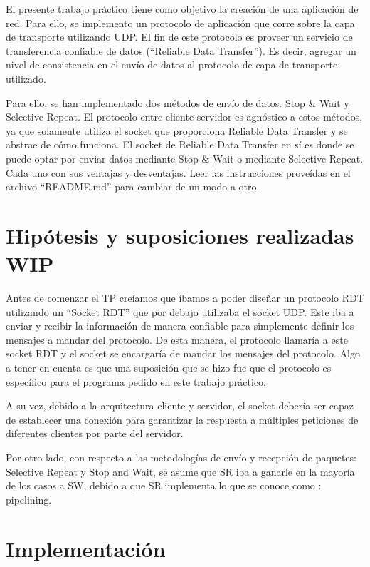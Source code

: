 \documentclass{article}
\begin{document}
El presente trabajo práctico tiene como objetivo la creación de una aplicación de red. Para ello, se implemento un protocolo de aplicación que corre sobre la capa de transporte utilizando UDP. El fin de este protocolo es proveer un servicio de transferencia confiable de datos (``Reliable Data Transfer''). Es decir, agregar un nivel de consistencia en el envío de datos al protocolo de capa de transporte utilizado.

Para ello, se han implementado dos métodos de envío de datos. Stop \& Wait y Selective Repeat. El protocolo entre cliente-servidor es agnóstico a estos métodos, ya que solamente utiliza el socket que proporciona Reliable Data Transfer y se abstrae de cómo funciona. El socket de Reliable Data Transfer en sí es donde se puede optar por enviar datos mediante Stop \& Wait o mediante Selective Repeat. Cada uno con sus ventajas y desventajas. Leer las instrucciones proveídas en el archivo ``README.md'' para cambiar de un modo a otro.

\section{\texorpdfstring{\textbf{Hipótesis y suposiciones realizadas
WIP}}{Hipótesis y suposiciones realizadas}}\label{hipuxf3tesis-y-suposiciones-realizadas-wip}

Antes de comenzar el TP creíamos que íbamos a poder diseñar un protocolo RDT utilizando un ``Socket RDT'' que por debajo utilizaba el socket UDP. Este iba a enviar y recibir la información de manera confiable para simplemente definir los mensajes a mandar del protocolo. De esta manera, el protocolo llamaría a este socket RDT y el socket se encargaría de mandar los mensajes del protocolo. Algo a tener en cuenta es que una suposición que se hizo fue que el protocolo es específico para el programa pedido en este trabajo práctico.

A su vez, debido a la arquitectura cliente y servidor, el socket debería ser capaz de establecer una conexión para garantizar la respuesta a múltiples peticiones de diferentes clientes por parte del servidor.

Por otro lado, con respecto a las metodologías de envío y recepción de paquetes: Selective Repeat y Stop and Wait, se asume que SR iba a ganarle en la mayoría de los casos a SW, debido a que SR implementa lo que se conoce como : pipelining.

\section{\texorpdfstring{\textbf{Implementación}}{Implementación}}\label{implementaciuxf3n-wip}
\end{document}
